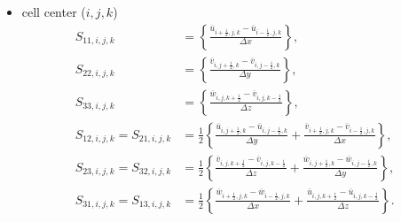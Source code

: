 \begin{itemize}
  \item cell center ($i,j,k$)
    \begin{align}
      S_{11,i,j,k} &= \left\{
      \frac{\overline{u}_{i+\frac{1}{2},j,k}-\overline{u}_{i-\frac{1}{2},j,k}}{\Delta x}
      \right\}, \\
      S_{22,i,j,k} &= \left\{
      \frac{\overline{v}_{i,j+\frac{1}{2},k}-\overline{v}_{i,j-\frac{1}{2},k}}{\Delta y}
      \right\}, \\
      S_{33,i,j,k} &= \left\{
      \frac{\overline{w}_{i,j,k+\frac{1}{2}}-\overline{v}_{i,j,k-\frac{1}{2}}}{\Delta z}
      \right\}, \\
      S_{12,i,j,k} = S_{21,i,j,k} &= \frac{1}{2}\left\{
      \frac{\overline{u}_{i,j+\frac{1}{2},k}-\overline{u}_{i,j-\frac{1}{2},k}}{\Delta y}
     +\frac{\overline{v}_{i+\frac{1}{2},j,k}-\overline{v}_{i-\frac{1}{2},j,k}}{\Delta x}
      \right\}, \\
      S_{23,i,j,k} = S_{32,i,j,k} &= \frac{1}{2}\left\{
      \frac{\overline{v}_{i,j,k+\frac{1}{2}}-\overline{v}_{i,j,k-\frac{1}{2}}}{\Delta z}
     +\frac{\overline{w}_{i,j+\frac{1}{2},k}-\overline{w}_{i,j-\frac{1}{2},k}}{\Delta y}
      \right\}, \\
      S_{31,i,j,k} = S_{13,i,j,k} &= \frac{1}{2}\left\{
      \frac{\overline{w}_{i+\frac{1}{2},j,k}-\overline{w}_{i-\frac{1}{2},j,k}}{\Delta x}
     +\frac{\overline{u}_{i,j,k+\frac{1}{2}}-\overline{u}_{i,j,k-\frac{1}{2}}}{\Delta z}
      \right\}.
    \end{align}


\end{itemize}
